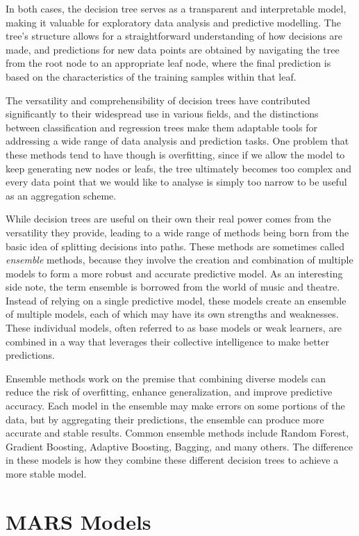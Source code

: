 In both cases, the decision tree serves as a transparent and interpretable model, making it valuable for exploratory data analysis and predictive modelling. The tree's structure allows for a straightforward understanding of how decisions are made, and predictions for new data points are obtained by navigating the tree from the root node to an appropriate leaf node, where the final prediction is based on the characteristics of the training samples within that leaf.

The versatility and comprehensibility of decision trees have contributed significantly to their widespread use in various fields, and the distinctions between classification and regression trees make them adaptable tools for addressing a wide range of data analysis and prediction tasks. One problem that these methods tend to have though is overfitting, since if we allow the model to keep generating new nodes or leafs, the tree ultimately becomes too complex and every data point that we would like to analyse is simply too narrow to be useful as an aggregation scheme. 

While decision trees are useful on their own their real power comes from the versatility they provide, leading to a wide range of methods being born from the basic idea of splitting decisions into paths. These methods are sometimes called \textit{ensemble} methods, because they involve the creation and combination of multiple models to form a more robust and accurate predictive model. As an interesting side note, the term ensemble is borrowed from the world of music and theatre. Instead of relying on a single predictive model, these models create an ensemble of multiple models, each of which may have its own strengths and weaknesses. These individual models, often referred to as base models or weak learners, are combined in a way that leverages their collective intelligence to make better predictions.

Ensemble methods work on the premise that combining diverse models can reduce the risk of overfitting, enhance generalization, and improve predictive accuracy. Each model in the ensemble may make errors on some portions of the data, but by aggregating their predictions, the ensemble can produce more accurate and stable results. Common ensemble methods include Random Forest, Gradient Boosting, Adaptive Boosting, Bagging, and many others. The difference in these models is how they combine these different decision trees to achieve a more stable model. 

\section{MARS Models}


